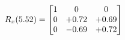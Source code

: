 \documentclass[preview]{standalone}
\begin{document}
\begin{align*}
\special{dvisvgm:raw <g id='unique000'>}R_{x}(5.52) = \begin{bmatrix}1 & 0 & 0 \\0 & +0.72 & +0.69 \\0 & -0.69 & +0.72\end{bmatrix}\special{dvisvgm:raw </g>}
\end{align*}
\end{document}
